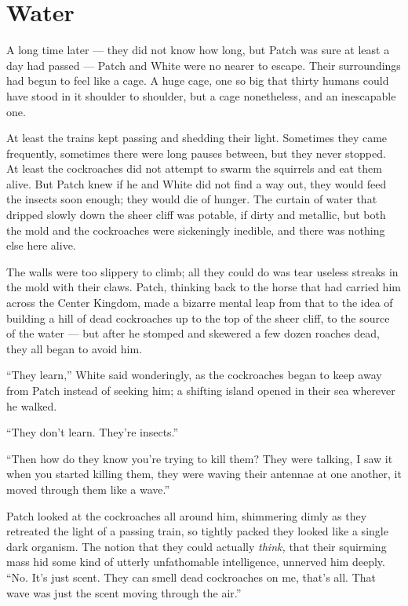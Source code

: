 \documentclass[12pt]{memoir}
\begin{document}

\section{Water}

A long time later — they did not know how long, but Patch was sure at
least a day had passed — Patch and White were no nearer to
escape. Their surroundings had begun to feel like a cage. A huge cage,
one so big that thirty humans could have stood in it shoulder to
shoulder, but a cage nonetheless, and an inescapable one.

At least the trains kept passing and shedding their light. Sometimes
they came frequently, sometimes there were long pauses between, but
they never stopped. At least the cockroaches did not attempt to swarm
the squirrels and eat them alive. But Patch knew if he and White did
not find a way out, they would feed the insects soon enough; they
would die of hunger. The curtain of water that dripped slowly down the
sheer cliff was potable, if dirty and metallic, but both the mold and
the cockroaches were sickeningly inedible, and there was nothing else
here alive.

The walls were too slippery to climb; all they could do was tear
useless streaks in the mold with their claws. Patch, thinking back to
the horse that had carried him across the Center Kingdom, made a
bizarre mental leap from that to the idea of building a hill of dead
cockroaches up to the top of the sheer cliff, to the source of the
water — but after he stomped and skewered a few dozen roaches dead,
they all began to avoid him.

“They learn,” White said wonderingly, as the cockroaches began to keep
away from Patch instead of seeking him; a shifting island opened in
their sea wherever he walked.

“They don’t learn. They’re insects.”

“Then how do they know you’re trying to kill them? They were talking,
I saw it when you started killing them, they were waving their
antennae at one another, it moved through them like a wave.”

Patch looked at the cockroaches all around him, shimmering dimly as
they retreated the light of a passing train, so tightly packed they
looked like a single dark organism. The notion that they could
actually \textit{think,} that their squirming mass hid some kind of
utterly unfathomable intelligence, unnerved him deeply. “No. It’s just
scent. They can smell dead cockroaches on me, that’s all. That wave
was just the scent moving through the air.”
\end{document}
